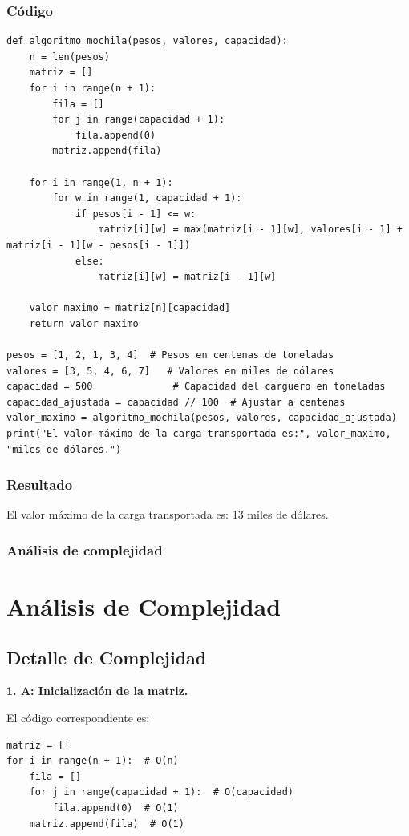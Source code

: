 \subsubsection{Código}
\begin{lstlisting}
def algoritmo_mochila(pesos, valores, capacidad):
    n = len(pesos)  
    matriz = []
    for i in range(n + 1):
        fila = []
        for j in range(capacidad + 1):
            fila.append(0)  
        matriz.append(fila)  

    for i in range(1, n + 1):  
        for w in range(1, capacidad + 1):  
            if pesos[i - 1] <= w:  
                matriz[i][w] = max(matriz[i - 1][w], valores[i - 1] + matriz[i - 1][w - pesos[i - 1]])  
            else:
                matriz[i][w] = matriz[i - 1][w]  

    valor_maximo = matriz[n][capacidad]
    return valor_maximo

pesos = [1, 2, 1, 3, 4]  # Pesos en centenas de toneladas
valores = [3, 5, 4, 6, 7]   # Valores en miles de dólares
capacidad = 500              # Capacidad del carguero en toneladas
capacidad_ajustada = capacidad // 100  # Ajustar a centenas
valor_maximo = algoritmo_mochila(pesos, valores, capacidad_ajustada)
print("El valor máximo de la carga transportada es:", valor_maximo, "miles de dólares.")
\end{lstlisting}

\subsubsection{Resultado}
El valor máximo de la carga transportada es: 13 miles de dólares.

\subsubsection{Análisis de complejidad}

\section*{Análisis de Complejidad}

\subsection*{Detalle de Complejidad}

\textbf{1. A: Inicialización de la matriz.}

El código correspondiente es:
\begin{lstlisting}
matriz = []
for i in range(n + 1):  # O(n)
    fila = []
    for j in range(capacidad + 1):  # O(capacidad)
        fila.append(0)  # O(1)
    matriz.append(fila)  # O(1)
\end{lstlisting}

